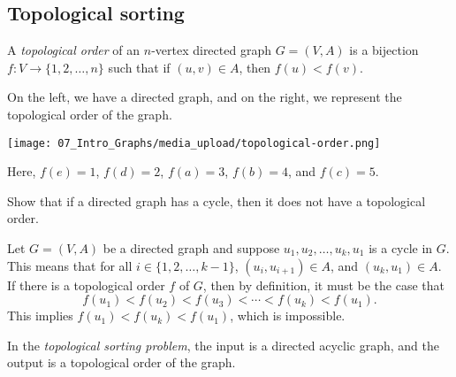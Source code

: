 \subsection{Topological sorting}


\begin{flex}
\begin{definition}
A \emph{topological order} of an $n$-vertex directed graph $G = (V,A)$ is a bijection $f: V \to \{1,2,\ldots,n\}$ such that if $(u,v) \in A$, then $f(u) < f(v)$. 
\end{definition}

\begin{example}
On the left, we have a directed graph, and on the right, we represent the topological order of the graph. 
\begin{center}
    \texttt{[image: 07\_Intro\_Graphs/media\_upload/topological-order.png]}
\end{center}
Here, $f(e) = 1$, $f(d) = 2$, $f(a) = 3$, $f(b) = 4$, and $f(c) = 5$.
\end{example}
\end{flex}


\begin{flex}
\begin{exercise}
Show that if a directed graph has a cycle, then it does not have a topological order.
\end{exercise}

\begin{solution}
Let $G=(V,A)$ be a directed graph and suppose $u_1,u_2,\ldots,u_k,u_1$ is a cycle in $G$. This means that for all $i \in \{1,2,\ldots,k-1\}$, $(u_i,u_{i+1}) \in A$, and $(u_k,u_1) \in A$. If there is a topological order $f$ of $G$, then by definition, it must be the case that
\[
f(u_1) < f(u_2) < f(u_3) < \cdots < f(u_k) < f(u_1).
\]
This implies $f(u_1) < f(u_k) < f(u_1)$, which is impossible.
\end{solution}
\end{flex}


\begin{definition}
In the \emph{topological sorting problem}, the input is a directed acyclic graph, and the output is a topological order of the graph.
\end{definition}


